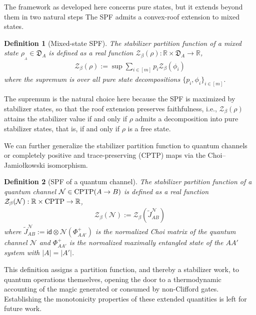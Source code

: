 \documentclass[aps,pra,superscriptaddress,twocolumn,longbibliography]{revtex4-2}
\newcommand{\cptp}{{\rm CPTP}}
\newcommand{\eqs}[1]{\begin{align}#1\end{align}}
\newtheorem{definition}{Definition}
\def\id{\mathsf{id}}
\def\mN{\mathcal{N}}
\def\mZ{\mathcal{Z}}
\def\md{\mathfrak{D}}
\def\mbR{\mathbb{R}}
\begin{document}
The framework as developed here concerns pure states, but it extends beyond them in two natural steps
The SPF admits a convex-roof extension to mixed states.
%
\begin{definition}[Mixed-state SPF]\label{def:mixed_state_SPF}
    The stabilizer partition function of a mixed state $\rho_{_{A}}\in \md_A$ is defined as a real function $\mathcal{Z}_{\beta}(\rho):\mbR\times \md_A\to \mbR$,
    \eqs{
    \mZ_{\beta}(\rho):= \sup \sum_{i\in [m]} p_i \mZ_{\beta}(\phi_i)
    }
    where the supremum is over all pure state decompositions $\{p_i, \phi_i\}_{i \in [m]}$.
\end{definition}
The supremum is the natural choice here because the SPF is maximized by stabilizer states, so that the roof extension preserves faithfulness, i.e., $\mZ_{\beta}(\rho)$ attains the stabilizer value if and only if $\rho$ admits a decomposition into pure stabilizer states, that is, if and only if $\rho$ is a free state.

We can further generalize the stabilizer partition function to quantum channels or completely positive and trace-preserving (CPTP) maps via the Choi–Jamio{\l}kowski isomorphism.
\begin{definition}[SPF of a quantum channel]
    The stabilizer partition function of a quantum channel $\mN\in \cptp(A\to B)$ is defined as a real function $\mathcal{Z}_{\beta}(\mN):\mbR\times \cptp \to \mbR$,
    \eqs{
    \mZ_{\beta}(\mN):= \mZ_{\beta}(\tilde{J}_{AB}^{\mN})
    }
    where $\tilde{J}_{AB}^{\mN}:=\id\otimes\mN(\Phi^+_{AA'})$ is the normalized Choi matrix of the quantum channel $\mN$ and $\Phi^+_{AA'}$ is the normalized maximally entangled state of the $AA'$ system with $|A|=|A'|$.
\end{definition}
This definition assigns a partition function, and thereby a stabilizer work, to quantum operations themselves, opening the door to a thermodynamic accounting of the magic generated or consumed by non-Clifford gates. Establishing the monotonicity properties of these extended quantities is left for future work.
\end{document}
